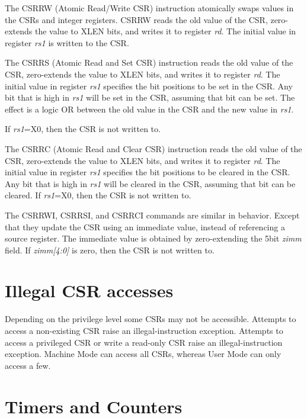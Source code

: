 \fi

The CSRRW (Atomic Read/Write CSR) instruction atomically swaps values in
the CSRs and integer registers. CSRRW reads the old value of the CSR,
zero-extends the value to XLEN bits, and writes it to register
\emph{rd}. The initial value in register \emph{rs1} is written to the
CSR.

The CSRRS (Atomic Read and Set CSR) instruction reads the old value of
the CSR, zero-extends the value to XLEN bits, and writes it to register
\emph{rd}. The initial value in register \emph{rs1} specifies the bit
positions to be set in the CSR. Any bit that is high in \emph{rs1} will
be set in the CSR, assuming that bit can be set. The effect is a logic
OR between the old value in the CSR and the new value in \emph{rs1}.

If \emph{rs1}=X0, then the CSR is not written to.

The CSRRC (Atomic Read and Clear CSR) instruction reads the old value of
the CSR, zero-extends the value to XLEN bits, and writes it to register
\emph{rd}. The initial value in register \emph{rs1} specifies the bit
positions to be cleared in the CSR. Any bit that is high in \emph{rs1}
will be cleared in the CSR, assuming that bit can be cleared. If
\emph{rs1}=X0, then the CSR is not written to.

The CSRRWI, CSRRSI, and CSRRCI commands are similar in behavior. Except
that they update the CSR using an immediate value, instead of
referencing a source register. The immediate value is obtained by
zero-extending the 5bit \emph{zimm} field. If \emph{zimm[4:0]} is
zero, then the CSR is not written to.

\section{Illegal CSR accesses}\label{illegal-csr-accesses}

Depending on the privilege level some CSRs may not be accessible.
Attempts to access a non-existing CSR raise an illegal-instruction
exception. Attempts to access a privileged CSR or write a read-only CSR
raise an illegal-instruction exception. Machine Mode can access all
CSRs, whereas User Mode can only access a
few.

\section{Timers and Counters}\label{timers-and-counters}

\ifdefined\MARKDOWN
\else

